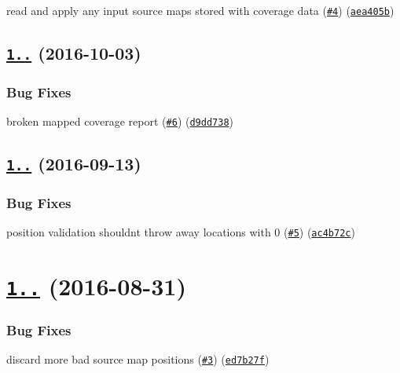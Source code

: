 \begin{DoxyItemize}
\item read and apply any input source maps stored with coverage data (\href{https://github.com/istanbuljs/istanbul-lib-source-maps/issues/4}{\tt \#4}) (\href{https://github.com/istanbuljs/istanbul-lib-source-maps/commit/aea405b}{\tt aea405b})
\end{DoxyItemize}

\label{_1.0.2}%
 \subsection*{\href{https://github.com/istanbuljs/istanbul-lib-source-maps/compare/v1.0.1...v1.0.2}{\tt 1..} (2016-\/10-\/03)}

\subsubsection*{Bug Fixes}


\begin{DoxyItemize}
\item broken mapped coverage report (\href{https://github.com/istanbuljs/istanbul-lib-source-maps/issues/6}{\tt \#6}) (\href{https://github.com/istanbuljs/istanbul-lib-source-maps/commit/d9dd738}{\tt d9dd738})
\end{DoxyItemize}

\label{_1.0.1}%
 \subsection*{\href{https://github.com/istanbuljs/istanbul-lib-source-maps/compare/v1.0.0...v1.0.1}{\tt 1..} (2016-\/09-\/13)}

\subsubsection*{Bug Fixes}


\begin{DoxyItemize}
\item position validation shouldn\textquotesingle{}t throw away locations with 0 (\href{https://github.com/istanbuljs/istanbul-lib-source-maps/issues/5}{\tt \#5}) (\href{https://github.com/istanbuljs/istanbul-lib-source-maps/commit/ac4b72c}{\tt ac4b72c})
\end{DoxyItemize}

\label{_1.0.0}%
 \section*{\href{https://github.com/istanbuljs/istanbul-lib-source-maps/compare/v1.0.0-alpha.9...v1.0.0}{\tt 1..} (2016-\/08-\/31)}

\subsubsection*{Bug Fixes}


\begin{DoxyItemize}
\item discard more bad source map positions (\href{https://github.com/istanbuljs/istanbul-lib-source-maps/issues/3}{\tt \#3}) (\href{https://github.com/istanbuljs/istanbul-lib-source-maps/commit/ed7b27f}{\tt ed7b27f}) 
\end{DoxyItemize}